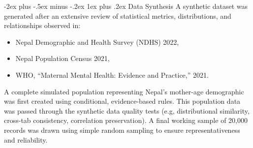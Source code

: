 \documentclass[conference]{IEEEtran}
\makeatletter
\def\section{\@startsection{section}{1}{0mm}
  {-2ex plus -.5ex minus -.2ex}
  {1ex plus .2ex}
  {\normalfont\large\bfseries}}
\makeatother
\begin{document}
\vspace{-6pt}
\section{Data Synthesis}
A synthetic dataset was generated after an extensive review of statistical metrics, distributions, and relationships observed in:
\begin{itemize}
    \item Nepal Demographic and Health Survey (NDHS) 2022,
    \item Nepal Population Census 2021,
    \item WHO, “Maternal Mental Health: Evidence and Practice,” 2021.
\end{itemize}
 
A complete simulated population representing Nepal’s mother-age 
demographic was first created using conditional, evidence-based rules. 
This population data was passed through the synthetic data quality tests 
(e.g, distributional similarity, cross-tab consistency, correlation 
preservation). A final working sample of 20,000 records was drawn 
using simple random sampling to ensure 
representativeness and reliability.
  
\vspace{-6pt}
\end{document}
